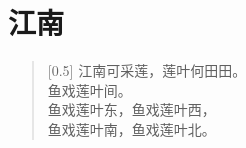 \documentclass[12pt,UTF-8,openany]{ctexbook}
\begin{document}
\clearpage

\begin{center}
    
    
\end{center}


\hanzibox{}\hanzibox{}\hanzibox{}\hanzibox{}\hspace{1em}\hanzibox{}\hanzibox{}\hanzibox{}\hanzibox{}

\hanzibox{}\hanzibox{}\hanzibox{}\hanzibox{}\hspace{1em}\hanzibox{}\hanzibox{}\hanzibox{}\hanzibox{}

\hanzibox{}\hanzibox{}\hanzibox{}\hanzibox{}\hspace{1em}\hanzibox{}\hanzibox{}\hanzibox{}\hanzibox{}

\hanzibox{}\hanzibox{}\hanzibox{}\hanzibox{}\hspace{1em}\hanzibox{}\hanzibox{}\hanzibox{}\hanzibox{}






\chapter{江南}

\begin{large}
    
    \begin{verse}[0.5\linewidth]
        江南可采莲，莲叶何田田。 \\
        鱼戏莲叶间。 \\
        鱼戏莲叶东，鱼戏莲叶西， \\
        鱼戏莲叶南，鱼戏莲叶北。
    \end{verse}
    
\end{large}


\clearpage

\begin{center}
    
\end{center}


\hanzibox{}\hanzibox{}\hanzibox{}\hanzibox{}\hspace{1em}\hanzibox{}\hanzibox{}\hanzibox{}\hanzibox{}
\end{document}
